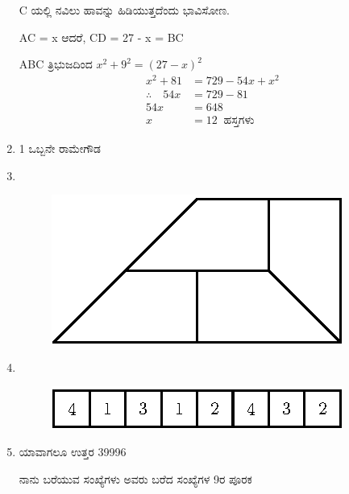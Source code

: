 \begin{enumerate}
\smallskip
C ಯಲ್ಲಿ  ನವಿಲು ಹಾವನ್ನು ಹಿಡಿಯುತ್ತದೆಂದು ಭಾವಿಸೋಣ.

AC = x ಆದರೆ, \qquad CD = 27 - x = BC

ABC ತ್ರಿಭುಜದಿಂದ \qquad $x^{2} + 9^{2} = (27 - x)^{2}$
\begin{align*}
x^{2} + 81 & = 729 - 54x + x^{2}\\
\therefore\quad 54x & = 729 - 81\\
54x & = 648\\
x & = 12 ~\text{ ಹಸ್ತಗಳು}
\end{align*}

\item 1 ಒಬ್ಬನೇ ರಾಮೇಗೌಡ 

\item 
~

\begin{figure}[H]
\centering
\includegraphics{images/chap2/ans28.eps}
\end{figure}

\item 
~

\begin{figure}[H]
\centering
\includegraphics{images/chap2/ans29.eps}
\end{figure}

\eject

\item ಯಾವಾಗಲೂ ಉತ್ತರ 39996

ನಾನು ಬರೆಯುವ ಸಂಖ್ಯೆಗಳು ಅವರು ಬರೆದ ಸಂಖ್ಯೆಗಳ 9ರ ಪೂರಕ 


\end{enumerate}
